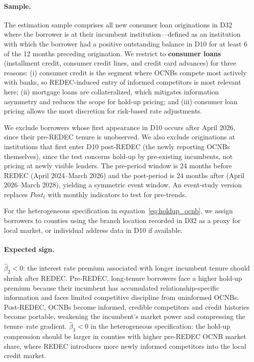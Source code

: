 \documentclass[12pt]{article}
\theoremstyle{plain}
\theoremstyle{plain}
\begin{document}
\paragraph{Sample.} The estimation sample comprises all new consumer loan originations in D32 where the borrower is at their incumbent institution---defined as an institution with which the borrower had a positive outstanding balance in D10 for at least 6 of the 12 months preceding origination. We restrict to \textbf{consumer loans} (installment credit, consumer credit lines, and credit card advances) for three reasons: (i) consumer credit is the segment where OCNBs compete most actively with banks, so REDEC-induced entry of informed competitors is most relevant here; (ii) mortgage loans are collateralized, which mitigates information asymmetry and reduces the scope for hold-up pricing; and (iii) consumer loan pricing allows the most discretion for risk-based rate adjustments.

We exclude borrowers whose first appearance in D10 occurs after April 2026, since their pre-REDEC tenure is unobserved. We also exclude originations at institutions that first enter D10 post-REDEC (the newly reporting OCNBs themselves), since the test concerns hold-up by pre-existing incumbents, not pricing at newly visible lenders. The pre-period window is 24 months before REDEC (April 2024--March 2026) and the post-period is 24 months after (April 2026--March 2028), yielding a symmetric event window. An event-study version replaces $Post_t$ with monthly indicators to test for pre-trends.

For the heterogeneous specification in equation~\ref{eq:holdup_ocnb}, we assign borrowers to counties using the branch location recorded in D32 as a proxy for local market, or individual address data in D10 if available.

\paragraph{Expected sign.} $\hat{\beta}_2 < 0$: the interest rate premium associated with longer incumbent tenure should shrink after REDEC. Pre-REDEC, long-tenure borrowers face a higher hold-up premium because their incumbent has accumulated relationship-specific information and faces limited competitive discipline from uninformed OCNBs. Post-REDEC, OCNBs become informed, credible competitors and credit histories become portable, weakening the incumbent's market power and compressing the tenure--rate gradient. $\hat{\beta}_3 < 0$ in the heterogeneous specification: the hold-up compression should be larger in counties with higher pre-REDEC OCNB market share, where REDEC introduces more newly informed competitors into the local credit market.
\end{document}
